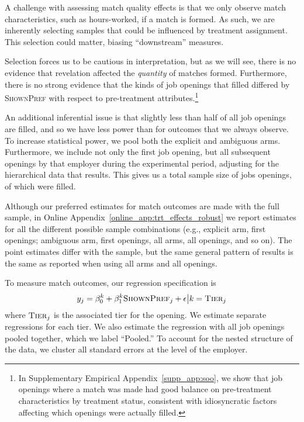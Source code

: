 \documentclass[12pt]{article}
\makeatletter
\renewcommand{\subsection}{%
  \@startsection{subsection}{2}{\z@}%
  {-3.25ex plus -1ex minus -.2ex}%
  {1.5ex plus .2ex}%
  {\normalfont\large\bfseries}%
}
\makeatother
\begin{document}

A challenge with assessing match quality effects is that we only observe match characteristics, such as hours-worked, if a match is formed.
As such, we are inherently selecting samples that could be influenced by treatment assignment.
This selection could matter, biasing ``downstream'' measures.  

Selection forces us to be cautious in interpretation, but as we will see, there is no evidence that revelation affected the \emph{quantity} of matches formed.
Furthermore, there is no strong evidence that the kinds of job openings that filled differed by \textsc{ShownPref} with respect to pre-treatment attributes.\footnote{In Supplementary Empirical Appendix~\ref{supp_app:soo}, we show that job openings where a match was made had good balance on pre-treatment characteristics by treatment status, consistent with idiosyncratic factors affecting which openings were actually filled.}

An additional inferential issue is that slightly less than half of all job openings are filled, and so we have less power than for outcomes that we always observe.
To increase statistical power, we pool both the explicit and ambiguous arms.
Furthermore, we include not only the first job opening, but all subsequent openings by that employer during the experimental period, adjusting for the hierarchical data that results.
This gives us a total sample size of \TotalSampleSize{} jobs openings, of which  \TotalFilledSampleSize{} were filled. 

Although our preferred estimates for match outcomes are made with the full sample, in Online Appendix~\ref{online_app:trt_effects_robust} we report estimates for all the different possible sample combinations (e.g., explicit arm, first openings; ambiguous arm, first openings, all arms, all openings, and so on).
The point estimates differ with the sample, but the same general pattern of results is the same as reported when using all arms and all openings. 

To measure match outcomes, our regression specification is 
\begin{align} \label{eq:match_outcomes}
  y_j = \beta^k_0 + \beta^k_1 \textsc{ShownPref}_j + \epsilon  \big| k = \textsc{Tier}_{j}
\end{align}
where $\textsc{Tier}_{j}$ is the associated tier for the opening. 
We estimate separate regressions for each tier.
We also estimate the regression with all job openings pooled together, which we label ``Pooled.'' 
To account for the nested structure of the data, we cluster all standard errors at the level of the employer. 
\end{document}
